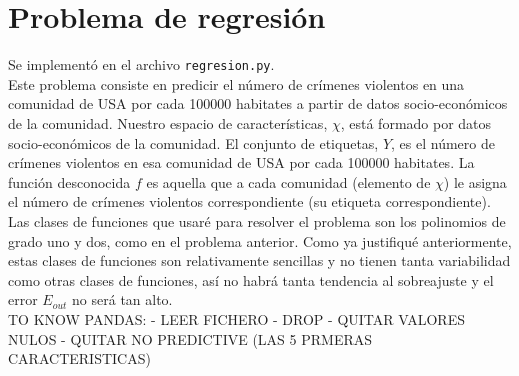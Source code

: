 \documentclass{article}
\begin{document}
\newpage
\section{Problema de regresión}

Se implementó en el archivo \texttt{regresion.py}.\\

Este problema consiste en predicir el número de crímenes violentos en una comunidad de USA por cada 100000 habitates a partir de datos socio-económicos de la comunidad. Nuestro espacio de características, $\chi$, está formado por datos socio-económicos de la comunidad. El conjunto de etiquetas, $Y$, es el número de crímenes violentos en esa comunidad de USA por cada 100000 habitates. La función desconocida $f$ es aquella que a cada comunidad (elemento de $\chi$) le asigna el número de crímenes violentos correspondiente (su etiqueta correspondiente).\\

Las clases de funciones que usaré para resolver el problema son los polinomios de grado uno y dos, como en el problema anterior. Como ya justifiqué anteriormente, estas clases de funciones son relativamente sencillas y no tienen tanta variabilidad como otras clases de funciones, así no habrá tanta tendencia al sobreajuste y el error $E_{out}$ no será tan alto.\\



TO KNOW PANDAS:
- LEER FICHERO
- DROP
- QUITAR VALORES NULOS
- QUITAR NO PREDICTIVE (LAS 5 PRMERAS CARACTERISTICAS) 
\end{document}
